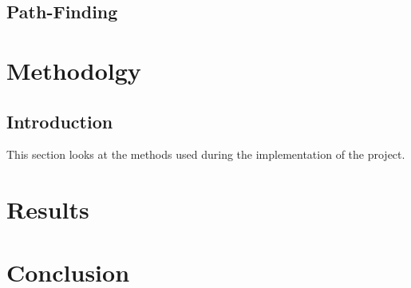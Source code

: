 \documentclass{article}
\begin{document}
\subsection{Path-Finding}
\section{Methodolgy}
\subsection{Introduction}
This section looks at the methods used during the implementation of the project. 
\section{Results}

\section{Conclusion}




\end{document}

